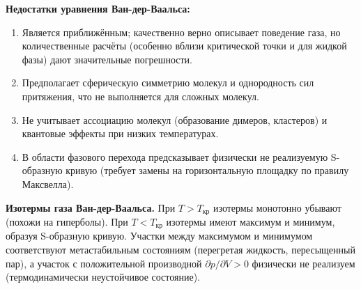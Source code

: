 \begin{remark}
\textbf{Недостатки уравнения Ван-дер-Ваальса:}
\begin{enumerate}
    \item Является приближённым; качественно верно описывает поведение газа, но количественные расчёты (особенно вблизи критической точки и для жидкой фазы) дают значительные погрешности.
    \item Предполагает сферическую симметрию молекул и однородность сил притяжения, что не выполняется для сложных молекул.
    \item Не учитывает ассоциацию молекул (образование димеров, кластеров) и квантовые эффекты при низких температурах.
    \item В области фазового перехода предсказывает физически не реализуемую S-образную кривую (требует замены на горизонтальную площадку по правилу Максвелла).
\end{enumerate}
\end{remark}

\begin{remark}
\textbf{Изотермы газа Ван-дер-Ваальса.}
При $T > T_{\text{кр}}$ изотермы монотонно убывают (похожи на гиперболы). При $T < T_{\text{кр}}$ изотермы имеют максимум и минимум, образуя S-образную кривую. Участки между максимумом и минимумом соответствуют метастабильным состояниям (перегретая жидкость, пересыщенный пар), а участок с положительной производной $\partial p/\partial V > 0$ физически не реализуем (термодинамически неустойчивое состояние).
\end{remark}
